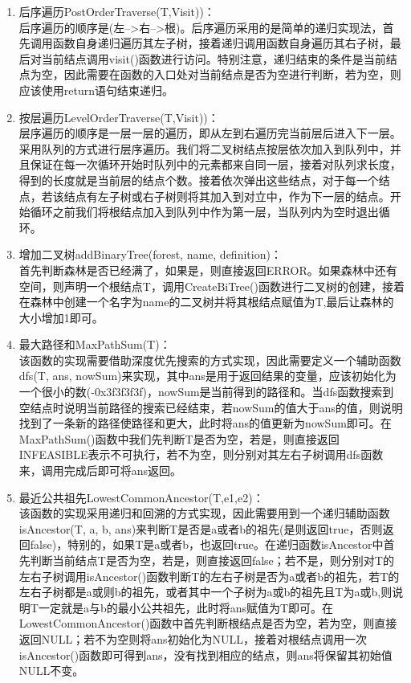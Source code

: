 \documentclass[supercite]{Experimental_Report}
\theoremstyle{definition}
\begin{document}
\begin{enumerate}
\begin{figure}
\begin{center}
		\end{center}
	\end{figure}
	\item 后序遍历PostOrderTraverse(T,Visit))：\\后序遍历的顺序是(左-->右-->根)。后序遍历采用的是简单的递归实现法，首先调用函数自身递归遍历其左子树，接着递归调用函数自身遍历其右子树，最后对当前结点调用visit()函数进行访问。特别注意，递归结束的条件是当前结点为空，因此需要在函数的入口处对当前结点是否为空进行判断，若为空，则应该使用return语句结束递归。
 	\item 按层遍历LevelOrderTraverse(T,Visit))：\\层序遍历的顺序是一层一层的遍历，即从左到右遍历完当前层后进入下一层。采用队列的方式进行层序遍历。我们将二叉树结点按层依次加入到队列中，并且保证在每一次循环开始时队列中的元素都来自同一层，接着对队列求长度，得到的长度就是当前层的结点个数。接着依次弹出这些结点，对于每一个结点，若该结点有左子树或右子树则将其加入到对立中，作为下一层的结点。开始循环之前我们将根结点加入到队列中作为第一层，当队列内为空时退出循环。
  	\item 增加二叉树addBinaryTree(forest, name, definition)：\\首先判断森林是否已经满了，如果是，则直接返回ERROR。如果森林中还有空间，则声明一个根结点T，调用CreateBiTree()函数进行二叉树的创建，接着在森林中创建一个名字为name的二叉树并将其根结点赋值为T,最后让森林的大小增加1即可。
   	\item 最大路径和MaxPathSum(T)：\\该函数的实现需要借助深度优先搜索的方式实现，因此需要定义一个辅助函数dfs(T, ans, nowSum)来实现，其中ans是用于返回结果的变量，应该初始化为一个很小的数(-0x3f3f3f3f)，nowSum是当前得到的路径和。当dfs函数搜索到空结点时说明当前路径的搜索已经结束，若nowSum的值大于ans的值，则说明找到了一条新的路径使路径和更大，此时将ans的值更新为nowSum即可。在MaxPathSum()函数中我们先判断T是否为空，若是，则直接返回INFEASIBLE表示不可执行，若不为空，则分别对其左右子树调用dfs函数来，调用完成后即可将ans返回。
    \item 最近公共祖先LowestCommonAncestor(T,e1,e2)：\\该函数的实现采用递归和回溯的方式实现，因此需要用到一个递归辅助函数isAncestor(T, a, b, ans)来判断T是否是a或者b的祖先(是则返回true，否则返回false)，特别的，如果T是a或者b，也返回true。在递归函数isAncestor中首先判断当前结点T是否为空，若是，则直接返回false；若不是，则分别对T的左右子树调用isAncestor()函数判断T的左右子树是否为a或者b的祖先，若T的左右子树都是a或则b的祖先，或者其中一个子树为a或b的祖先且T为a或b,则说明T一定就是a与b的最小公共祖先，此时将ans赋值为T即可。在LowestCommonAncestor()函数中首先判断根结点是否为空，若为空，则直接返回NULL；若不为空则将ans初始化为NULL，接着对根结点调用一次isAncestor()函数即可得到ans，没有找到相应的结点，则ans将保留其初始值NULL不变。

\end{enumerate}
\end{document}
